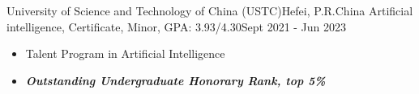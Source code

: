     \vspace{-7pt}
    \resumeSubheading
        {University of Science and Technology of China (USTC)}{Hefei, P.R.China}
        {Artificial intelligence, Certificate, Minor, GPA: 3.93/4.30}{Sept 2021 - Jun 2023}
        \vspace{-7pt}
         \begin{itemize}
         \setlength{\itemsep}{0pt}
            \item\small
            Talent Program in Artificial Intelligence 
            \item\small
            \textit{\textbf{Outstanding Undergraduate Honorary Rank, top 5\%}}
         \end{itemize}
      
    \resumeSubHeadingListEnd